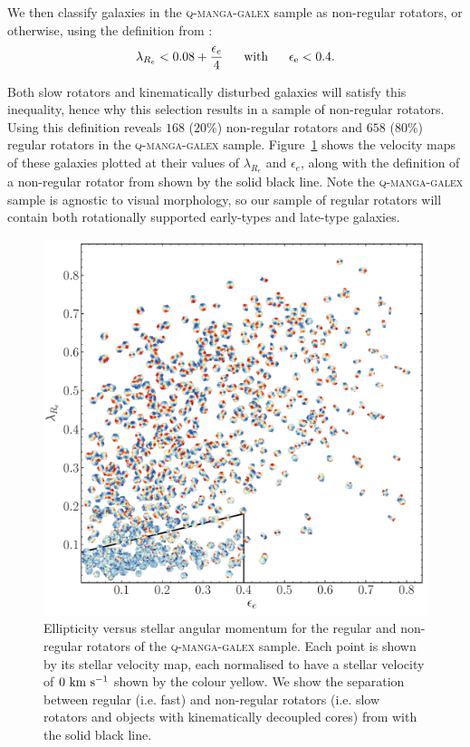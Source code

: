 \documentclass[useAMS,usenatbib]{mn2e}
\begin{document}
We then classify galaxies in the \textsc{q-manga-galex} sample as non-regular rotators, or otherwise, using the definition from \cite{cappellari16}:
\begin{equation}\label{eq:fvs}
\lambda_{R_{e}} < 0.08 + \frac{\epsilon_e}{4} ~~~~~ \rm{with} ~~~~~ \epsilon_e < 0.4.
\end{equation}

Both slow rotators and kinematically disturbed galaxies will satisfy this inequality, hence why this selection results in a sample of non-regular rotators.  Using this definition reveals $168$ ($20\%$) non-regular rotators and $658$ ($80\%$) regular rotators in the \textsc{q-manga-galex} sample. Figure~\ref{fig:evsl} shows the velocity maps of these galaxies plotted at their values of $\lambda_{R_{e}}$ and $\epsilon_e$, along with the definition of a non-regular rotator from \cite{cappellari16} shown by the solid black line. Note the \textsc{q-manga-galex} sample is agnostic to visual morphology, so our sample of regular rotators will contain both rotationally supported early-types and late-type galaxies. 

\begin{figure}
\centering
\includegraphics[width=\textwidth]{../figures/NSF_orig_cmap_vel_maps_large_nonkdc_VOR10_noalpha.pdf}
\caption{Ellipticity versus stellar angular momentum for the regular and non-regular rotators of the \textsc{q-manga-galex} sample. Each point is shown by its stellar velocity map, each normalised to have a stellar velocity of $0~\rm{km}~\rm{s}^{-1}$ shown by the colour yellow. We show the separation between regular (i.e. fast) and non-regular rotators (i.e. slow rotators and objects with kinematically decoupled cores) from \protect\cite{cappellari16} with the solid black line.}
\label{fig:evsl}
\end{figure}  
\end{document}
